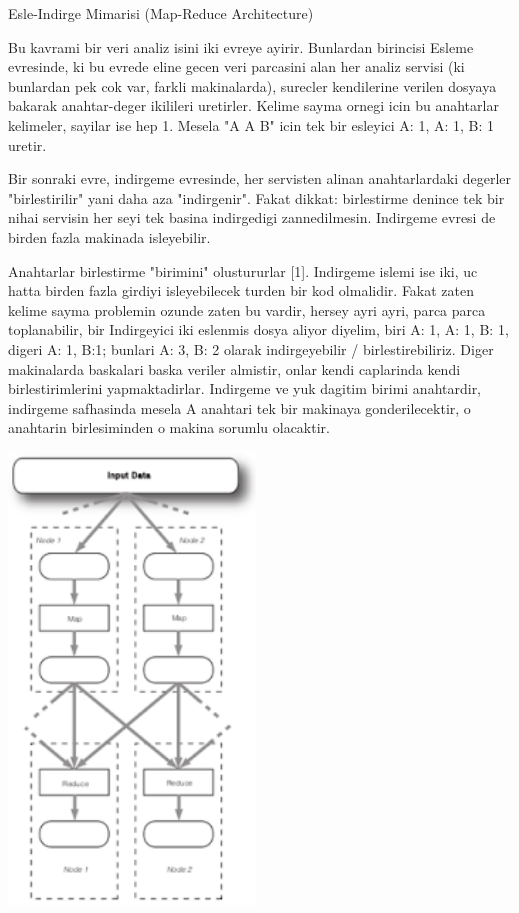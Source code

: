 \documentclass[12pt,fleqn]{article}\usepackage{../common}
\begin{document}
Esle-Indirge Mimarisi (Map-Reduce Architecture)

Bu kavrami bir veri analiz isini iki evreye ayirir. Bunlardan birincisi
Esleme evresinde, ki bu evrede eline gecen veri parcasini alan her analiz
servisi (ki bunlardan pek cok var, farkli makinalarda), surecler
kendilerine verilen dosyaya bakarak anahtar-deger ikilileri
uretirler. Kelime sayma ornegi icin bu anahtarlar kelimeler, sayilar ise
hep 1. Mesela "A A B" icin tek bir esleyici A: 1, A: 1, B: 1 uretir.

Bir sonraki evre, indirgeme evresinde, her servisten alinan anahtarlardaki
degerler "birlestirilir" yani daha aza "indirgenir". Fakat dikkat:
birlestirme denince tek bir nihai servisin her seyi tek basina indirgedigi
zannedilmesin. Indirgeme evresi de birden fazla makinada isleyebilir.

Anahtarlar birlestirme "birimini" olustururlar [1]. Indirgeme islemi ise
iki, uc hatta birden fazla girdiyi isleyebilecek turden bir kod
olmalidir. Fakat zaten kelime sayma problemin ozunde zaten bu vardir,
hersey ayri ayri, parca parca toplanabilir, bir Indirgeyici iki eslenmis
dosya aliyor diyelim, biri A: 1, A: 1, B: 1, digeri A: 1, B:1; bunlari A:
3, B: 2 olarak indirgeyebilir / birlestirebiliriz.  Diger makinalarda
baskalari baska veriler almistir, onlar kendi caplarinda kendi
birlestirimlerini yapmaktadirlar. Indirgeme ve yuk dagitim birimi
anahtardir, indirgeme safhasinda mesela A anahtari tek bir makinaya
gonderilecektir, o anahtarin birlesiminden o makina sorumlu olacaktir.

\includegraphics[height=12cm]{mr.png}
\end{document}
